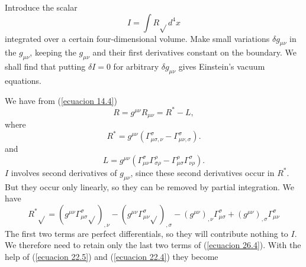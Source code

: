Introduce the scalar
\begin{equation}
 \label{ecuacion 26.1}
 I = \int{R \sqrt{} d^4 x}
\end{equation}
integrated over a certain four-dimensional volume. Make small variations $\delta g_{\mu\nu}$ in the $g_{\mu\nu}$, 
keeping the $g_{\mu\nu}$ and their first derivatives constant on the boundary. We shall find that putting $\delta I = 
0$ for arbitrary $\delta g_{\mu\nu}$ gives Einstein's vacuum equations.

We have from (\ref{ecuacion 14.4})
\[
 R = g^{\mu\nu} R_{\mu\nu} = R^{*} - L,
\]
where
\begin{equation}
 \label{ecuacion 26.2}
 R^{*} = g^{\mu\nu} \left( \Gamma^\sigma_{\mu\sigma,\nu} - \Gamma^\sigma_{\mu\nu,\sigma} \right).
\end{equation}
and
\begin{equation}
 \label{ecuacion 26.3}
 L = g^{\mu\nu} \left( 
    \Gamma^\sigma_{\mu\nu}\Gamma^\rho_{\sigma\rho} - \Gamma^\rho_{\mu\sigma}\Gamma^\sigma_{\nu\rho}
 \right).
\end{equation}
$I$ involves second derivatives of $g_{\mu\nu}$, since these second derivatives occur in $R^{*}$. But they occur only 
linearly, so they can be removed by partial integration. We have
\begin{equation}
 \label{ecuacion 26.4}
 R^{*}\sqrt{} = \left( 
    g^{\mu\nu} \Gamma^\sigma_{\mu\sigma} \sqrt{}
 \right)_{,\nu} -
 \left( 
    g^{\mu\nu} \Gamma^\sigma_{\mu\nu} \sqrt{}
 \right)_{,\sigma}
 -\left(
    g^{\mu\nu}
 \right)_{,\nu} \Gamma^\sigma_{\mu\sigma}
 +\left(
    g^{\mu\nu}
 \right)_{,\sigma} \Gamma^\sigma_{\mu\nu}
\end{equation}
The first two terms are perfect differentials, so they will contribute nothing to $I$. We therefore need to retain only 
the last two terms of (\ref{ecuacion 26.4}). With the help of (\ref{ecuacion 22.5}) and (\ref{ecuacion 22.4}) they 
become



